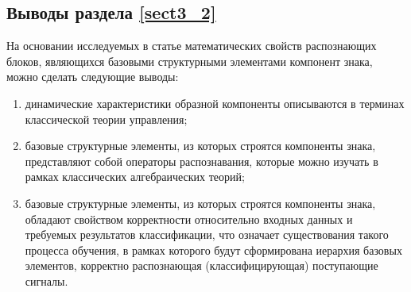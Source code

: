 \subsection{Выводы раздела \ref{sect3_2}}
На основании исследуемых в статье математических свойств распознающих блоков, являющихся базовыми структурными элементами компонент знака, можно сделать следующие выводы:
\begin{enumerate}
\item 
	динамические характеристики образной компоненты описываются в терминах классической теории управления;
\item
	базовые структурные элементы, из которых строятся компоненты знака, представляют собой операторы распознавания, которые можно изучать в рамках классических алгебраических теорий;
\item
	базовые структурные элементы, из которых строятся компоненты знака, обладают свойством корректности относительно входных данных и требуемых результатов классификации, что означает существования такого процесса обучения, в рамках которого будут сформирована иерархия базовых элементов, корректно распознающая (классифицирующая) поступающие сигналы.
\end{enumerate}

\clearpage